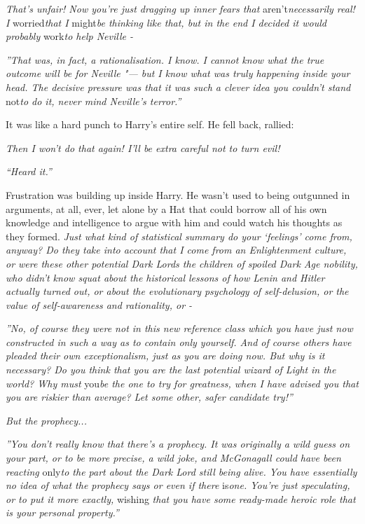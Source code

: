 \emph{That's unfair! Now you're just dragging up inner fears that}
aren't\emph{necessarily real! I} worried\emph{that I} might\emph{be
thinking like that, but in the end I decided it would probably}
work\emph{to help Neville -}

\emph{''That was, in fact, a rationalisation. I know. I cannot know what
the true outcome will be for Neville "--- but I know what was truly
happening inside your head. The decisive pressure was that it was such a
clever idea you couldn't stand} not\emph{to do it, never mind Neville's
terror.''}

It was like a hard punch to Harry's entire self. He fell back, rallied:

\emph{Then I won't do that again! I'll be extra careful not to turn
evil!}

\emph{``Heard it.''}

Frustration was building up inside Harry. He wasn't used to being
outgunned in arguments, at all, ever, let alone by a Hat that could
borrow all of his own knowledge and intelligence to argue with him and
could watch his thoughts as they formed. \emph{Just what kind of
statistical summary do your `feelings' come from, anyway? Do they take
into account that I come from an Enlightenment culture, or were these
other potential Dark Lords the children of spoiled Dark Age nobility,
who didn't know squat about the historical lessons of how Lenin and
Hitler actually turned out, or about the evolutionary psychology of
self-delusion, or the value of self-awareness and rationality, or -}

\emph{''No, of course they were not in this new reference class which you
have just now constructed in such a way as to contain only yourself. And
of course others have pleaded their own exceptionalism, just as you are
doing now. But why is it necessary? Do you think that you are the last
potential wizard of Light in the world? Why must} you\emph{be the one to
try for greatness, when I have advised you that you are riskier than
average? Let some other, safer candidate try!''}

\emph{But the prophecy...}

\emph{''You don't really know that there's a prophecy. It was originally
a wild guess on your part, or to be more precise, a wild joke, and
McGonagall could have been reacting} only\emph{to the part about the
Dark Lord still being alive. You have essentially no idea of what the
prophecy says or even if there} is\emph{one. You're just speculating, or
to put it more exactly,} wishing \emph{that you have some ready-made
heroic role that is your personal property.''}

